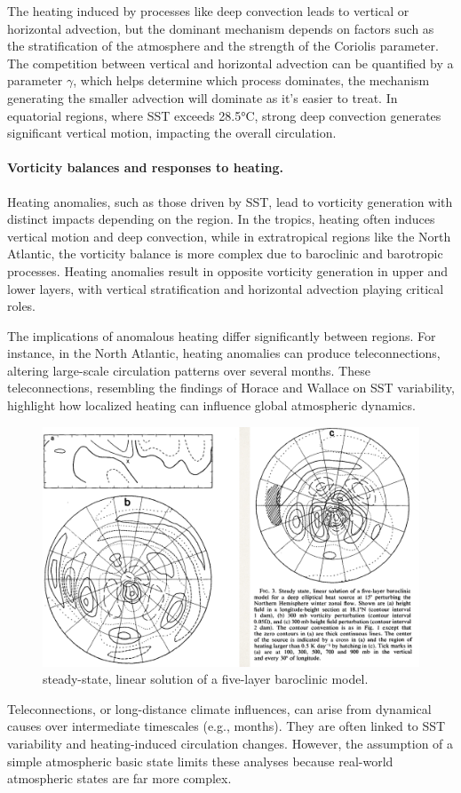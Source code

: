 The heating induced by processes like deep convection leads to vertical or horizontal advection, but the dominant mechanism depends on factors such as the stratification of the atmosphere and the strength of the Coriolis parameter. The competition between vertical and horizontal advection can be quantified by a parameter $\gamma$, which helps determine which process dominates, the mechanism generating the smaller advection will dominate as it's easier to treat. In equatorial regions, where SST exceeds 28.5°C, strong deep convection generates significant vertical motion, impacting the overall circulation.

\paragraph{Vorticity balances and responses to heating.}
Heating anomalies, such as those driven by SST, lead to vorticity generation with distinct impacts depending on the region. In the tropics, heating often induces vertical motion and deep convection, while in extratropical regions like the North Atlantic, the vorticity balance is more complex due to baroclinic and barotropic processes. Heating anomalies result in opposite vorticity generation in upper and lower layers, with vertical stratification and horizontal advection playing critical roles.

The implications of anomalous heating differ significantly between regions. For instance, in the North Atlantic, heating anomalies can produce teleconnections, altering large-scale circulation patterns over several months. These teleconnections, resembling the findings of Horace and Wallace on SST variability, highlight how localized heating can influence global atmospheric dynamics.
\begin{figure}[htp!]
	\centering
	\includegraphics[width=0.4\linewidth]{uploads/Screenshot 2024-11-26 104358.png}
	\caption{steady-state, linear solution of a five-layer baroclinic model.}
	\label{fig:enter-label}
\end{figure}

Teleconnections, or long-distance climate influences, can arise from dynamical causes over intermediate timescales (e.g., months). They are often linked to SST variability and heating-induced circulation changes. However, the assumption of a simple atmospheric basic state limits these analyses because real-world atmospheric states are far more complex.


